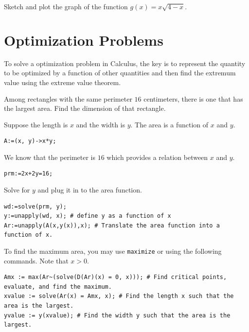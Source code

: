 \documentclass[]{book}
\theoremstyle{definition}
\theoremstyle{definition}
\theoremstyle{definition}
\theoremstyle{remark}
\let\BeginKnitrBlock\begin \let\EndKnitrBlock\end
\begin{document}
\BeginKnitrBlock{exercise}
\protect\hypertarget{exr:unnamed-chunk-121}{}{\label{exr:unnamed-chunk-121} }
Sketch and plot the graph of the function \(g(x)=x\sqrt{4-x}\).
\EndKnitrBlock{exercise}

\hypertarget{optimization-problems}{%
\section{Optimization Problems}\label{optimization-problems}}

To solve a optimization problem in Calculus, the key is to represent the quantity to be optimized by a function of other quantities and then find the extremum value using the extreme value theorem.

\BeginKnitrBlock{example}
\protect\hypertarget{exm:unnamed-chunk-122}{}{\label{exm:unnamed-chunk-122} }
Among rectangles with the same perimeter \(16\) centimeters, there is one that has the largest area. Find the dimension of that rectangle.
\EndKnitrBlock{example}

\BeginKnitrBlock{solution}
{}
Suppose the length is \(x\) and the width is \(y\). The area is a function of \(x\) and \(y\).

\begin{verbatim}
A:=(x, y)->x*y;
\end{verbatim}

We know that the perimeter is \(16\) which provides a relation between \(x\) and \(y\).

\begin{verbatim}
prm:=2x+2y=16;
\end{verbatim}

Solve for \(y\) and plug it in to the area function.

\begin{verbatim}
wd:=solve(prm, y);
y:=unapply(wd, x); # define y as a function of x
Ar:=unapply(A(x,y(x)),x); # Translate the area function into a function of x.
\end{verbatim}

To find the maximum area, you may use \texttt{maximize} or using the following commands. Note that \(x>0\).

\begin{verbatim}
Amx := max(Ar~(solve(D(Ar)(x) = 0, x))); # Find critical points, evaluate, and find the maximum.
xvalue := solve(Ar(x) = Amx, x); # Find the length x such that the area is the largest. 
yvalue := y(xvalue); # Find the width y such that the area is the largest.
\end{verbatim}
\EndKnitrBlock{solution}
\end{document}
